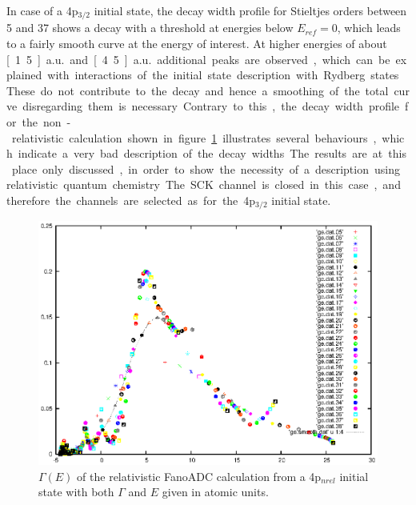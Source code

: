In case of a 4p$_{3/2}$ initial state, the decay width profile for Stieltjes
orders between 5 and 37 shows a decay
with a threshold at energies below $E_{ref}=0$, which leads to a fairly smooth
curve at the energy of interest.
At higher energies of about \unit[1.5]{a.u.} and
\unit[4.5]{a.u.} additional peaks are observed, which can be explained with
interactions of the initial state description with Rydberg states. These do not
contribute to the decay and hence a smoothing of the total curve disregarding them
is necessary.

Contrary to this, the decay width profile for the non-relativistic calculation
shown in figure \ref{figure:Xe4pnrel_Gamma_profile} illustrates several
behaviours, which indicate a very bad description of the decay widths.
The results are at this place only discussed, in order to show the necessity
of a description using relativistic quantum chemistry. The \ac{SCK} channel
is closed in this case, and therefore the channels are selected as for the
4p$_{3/2}$ initial state.

\begin{figure}[htb]
  \centering
  \includegraphics[scale=1.0]{pics/Xe4p_nrel_gammae.eps}
  \caption{$\Gamma(E)$ of the relativistic FanoADC calculation from a 4p$_{nrel}$
           initial state with both $\Gamma$ and $E$ given in atomic units.
           }
  \label{figure:Xe4pnrel_Gamma_profile}
\end{figure}

